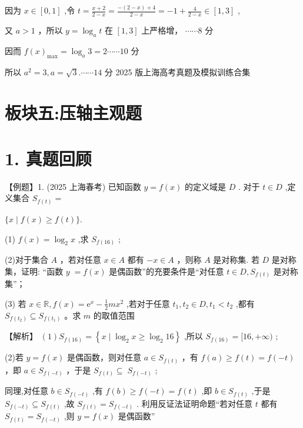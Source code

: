 \documentclass[10pt]{article}
\begin{document}
因为 \(x \in  \left\lbrack  {0,1}\right\rbrack\) ,令 \(t = \frac{x + 2}{2 - x} = \frac{-\left( {2 - x}\right)  + 4}{2 - x} =  - 1 + \frac{4}{2 - x} \in  \left\lbrack  {1,3}\right\rbrack\) ,

又 \(a > 1\) ，所以 \(y = {\log }_{a}t\) 在 \(\left\lbrack  {1,3}\right\rbrack\) 上严格增， \(\cdots \cdots 8\) 分

因而 \(f{\left( x\right) }_{\max } = {\log }_{a}3 = 2\cdots \cdots {10}\) 分

所以 \({a}^{2} = 3,a = \sqrt{3}.\cdots \cdots {14}\) 分 2025 版上海高考真题及模拟训练合集

\section*{板块五:压轴主观题}

\section*{1. 真题回顾}

【例题】1. (2025 上海春考) 已知函数 \(y = f\left( x\right)\) 的定义域是 \(D\) . 对于 \(t \in  D\) ,定义集合 \({S}_{f\left( t\right) } =\)

\(\{ x \mid  f\left( x\right)  \geq  f\left( t\right) \} .\)

(1) \(f\left( x\right)  = {\log }_{2}x\) ,求 \({S}_{f\left( {16}\right) }\) ;

(2)对于集合 \(A\) ，若对任意 \(x \in  A\) 都有 \(- x \in  A\) ，则称 \(A\) 是对称集. 若 \(D\) 是对称集，证明: “函数 \(y \; = f\left( x\right)\) 是偶函数”的充要条件是“对任意 \(t \in  D,{S}_{f\left( t\right) }\) 是对称集”；

(3) 若 \(x \in  \mathbb{R},f\left( x\right)  = {\mathrm{e}}^{x} - \frac{1}{2}m{x}^{2}\) ,若对于任意 \({t}_{1},{t}_{2} \in  D,{t}_{1} < {t}_{2}\) ,都有 \({S}_{f\left( {t}_{2}\right) } \subseteq  {S}_{f\left( {t}_{1}\right) }\) 。求 \(m\) 的取值范围

【解析】 \(\left( 1\right) {S}_{f\left( {16}\right) } = \left\{  {x \mid  {\log }_{2}x \geq  {\log }_{2}{16}}\right\}\) ,所以 \({S}_{f\left( {16}\right) } = \lbrack {16}, + \infty )\) ;

(2)若 \(y = f\left( x\right)\) 是偶函数，则对任意 \(a \in  {S}_{f\left( t\right) }\) ，有 \(f\left( a\right)  \geq  f\left( t\right)  = f\left( {-t}\right)\) ，即 \(a \in  {S}_{f\left( {-t}\right) }\) ，于是 \({S}_{f\left( t\right) } \subseteq \; {S}_{f\left( {-t}\right) }\) ;

同理,对任意 \(b \in  {S}_{f\left( {-t}\right) }\) ,有 \(f\left( b\right)  \geq  f\left( {-t}\right)  = f\left( t\right)\) ,即 \(b \in  {S}_{f\left( t\right) }\) ,于是 \({S}_{f\left( {-t}\right) } \subseteq  {S}_{f\left( t\right) }\) ,故 \({S}_{f\left( t\right) } = {S}_{f\left( {-t}\right) }\) . 利用反证法证明命题“若对任意 \(t\) 都有 \({S}_{f\left( t\right) } = {S}_{f\left( {-t}\right) }\) ,则 \(y = f\left( x\right)\) 是偶函数”
\end{document}
